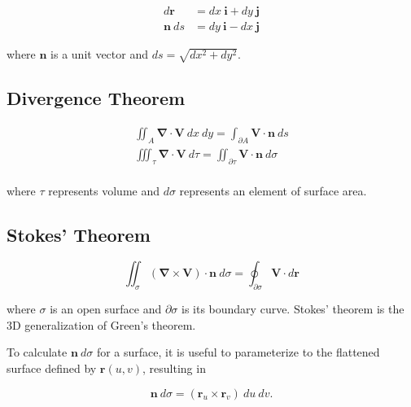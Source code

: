\begin{align*}
    d\mathbf{r}   & = dx~\mathbf{i} + dy~\mathbf{j} \tag{tangent}        \\
    \mathbf{n}~ds & = dy~\mathbf{i} - dx~\mathbf{j} \tag{outward normal}
\end{align*}

where $\mathbf{n}$ is a unit vector and $ds = \sqrt{dx^2 + dy^2}$.

\subsection{Divergence Theorem}

\begin{align*}
    \iint_A \bm{\nabla} \cdot \mathbf{V}~dx~dy = \int_{\partial A} \mathbf{V} \cdot \mathbf{n}~ds \tag{2-dimensional}               \\
    \iiint_\tau \bm{\nabla} \cdot \mathbf{V}~d\tau  = \iint_{\partial \tau} \mathbf{V} \cdot \mathbf{n}~d\sigma \tag{3-dimensional} \\
\end{align*}

where $\tau$ represents volume and $d\sigma$ represents an element of surface area.

\subsection{Stokes' Theorem}

\begin{equation*}
    \iint_\sigma (\bm{\nabla} \times \mathbf{V}) \cdot \mathbf{n}~d\sigma = \oint_{\partial \sigma} \mathbf{V} \cdot d\mathbf{r}
\end{equation*}

where $\sigma$ is an open surface and $\partial \sigma$ is its boundary curve. Stokes' theorem is the 3D generalization of Green's theorem.

\vsp
To calculate $\mathbf{n}~d\sigma$ for a surface, it is useful to parameterize to the flattened surface defined by $\mathbf{r}(u,v)$, resulting in

\begin{equation*}
    \mathbf{n}~d\sigma = (\mathbf{r}_u \times \mathbf{r}_v)~du~dv\text{.}
\end{equation*}
